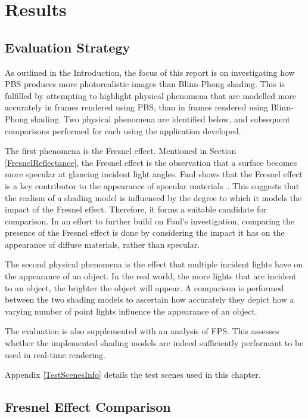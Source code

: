 \chapter{Results}
\label{chapter3}

\section{Evaluation Strategy}

As outlined in the Introduction, the focus of this report is on investigating how PBS produces more photorealistic images than Blinn-Phong shading. This is fulfilled by attempting to highlight physical phenomena that are modelled more accurately in frames rendered using PBS, than in frames rendered using Blinn-Phong shading. Two physical phenomena are identified below, and subsequent comparisons performed for each using the application developed.

The first phenomena is the Fresnel effect. Mentioned in Section \ref{FresnelReflectance}, the Fresnel effect is the observation that a surface becomes more specular at glancing incident light angles. Faul shows that the Fresnel effect is a key contributor to the appearance of specular materials~\cite{FaulInfluenceOfFresnelEffect}. This suggests that the realism of a shading model is influenced by the degree to which it models the impact of the Fresnel effect. Therefore, it forms a suitable candidate for comparison. In an effort to further build on Faul's investigation, comparing the presence of the Fresnel effect is done by considering the impact it has on the appearance of diffuse materials, rather than specular.

The second physical phenomena is the effect that multiple incident lights have on the appearance of an object. In the real world, the more lights that are incident to an object, the brighter the object will appear. A comparison is performed between the two shading models to ascertain how accurately they depict how a varying number of point lights influence the appearance of an object.

The evaluation is also supplemented with an analysis of FPS. This assesses whether the implemented shading models are indeed sufficiently performant to be used in real-time rendering.

Appendix \ref{TestScenesInfo} details the test scenes used in this chapter.

\section{Fresnel Effect Comparison}


